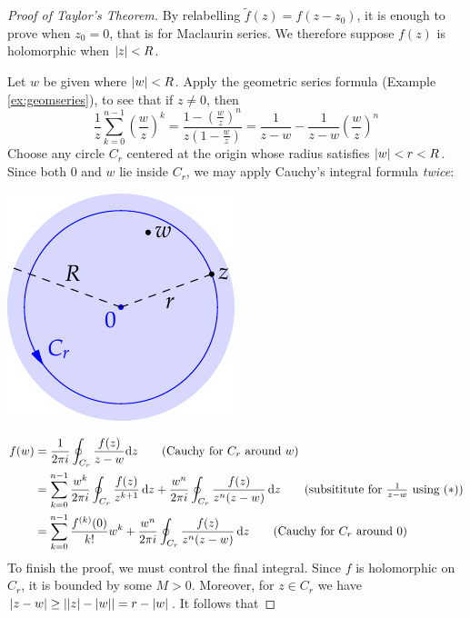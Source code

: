 \begin{proof}[Proof of Taylor's Theorem]
	By relabelling $\tilde f(z)=f(z-z_0)$, it is enough to prove when $z_0=0$, that is for Maclaurin series. We therefore suppose $f(z)$ is holomorphic when $\left| z\right|<R$.\par
	\begin{minipage}[t]{0.7\linewidth}\vspace{-2pt}
		Let $w$ be given where $\left| w\right|<R$. Apply the geometric series formula (Example \ref{ex:geomseries}), to see that if $z\neq 0$, then
		\[
			\frac 1z\sum_{k=0}^{n-1}\left(\frac wz\right)^k
			=\frac{1-\left(\frac wz\right)^n}{z(1-\frac wz)} 
			=\frac 1{z-w}-\frac 1{z-w}\left(\frac wz\right)^n
			\tag{$\ast$}
		\]
		Choose any circle $C_r$ centered at the origin whose radius satisfies $\left| w\right|<r<R$. Since both $0$ and $w$ lie inside $C_r$, we may apply Cauchy's integral formula \emph{twice}:
	\end{minipage}
	\hfill
	\begin{minipage}[t]{0.29\linewidth}\vspace{-2pt}
		\flushright\includegraphics[scale=0.95]{taylor}
	\end{minipage}\par
	\vspace{-6pt}
	\begin{align*}
		f(w)
		&=\frac 1{2\pi i}\oint_{C_r}\frac{f(z)}{z-w}\dz
			\tag{Cauchy for $C_r$ around $w$}\\
		&=\sum_{k=0}^{n-1}\frac{w^k}{2\pi i}\oint_{C_r}\frac{f(z)}{z^{k+1}}\,\dz
			+\frac{w^n}{2\pi i}\oint_{C_r}\frac{f(z)}{z^n(z-w)}\,\dz
			\tag{subsititute for $\frac 1{z-w}$ using $(\ast)$}\\
	 	&=\sum_{k=0}^{n-1} \frac{f^{(k)}(0)}{k!}w^k 
	 		+\frac{w^n}{2\pi i}\oint_{C_r}\frac{f(z)}{z^n(z-w)}\,\dz
	 		\tag{Cauchy for $C_r$ around $0$}
	\end{align*}
	To finish the proof, we must control the final integral. Since $f$ is holomorphic on $C_r$, it is bounded by some $M>0$. Moreover, for $z\in C_r$ we have $\left| z-w\right|\ge \left| \left| z\right|-\left| w\right|\right|= r-\left| w\right|$. It follows that

\end{proof}

